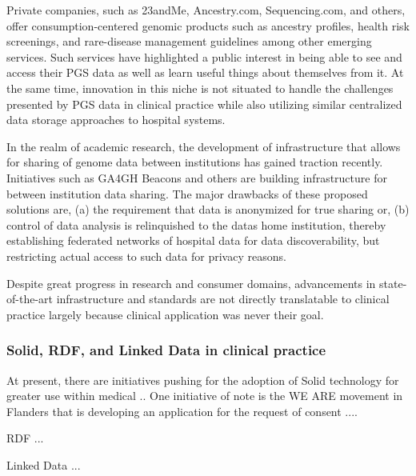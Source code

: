 \documentclass[runningheads]{llncs}
\begin{document}
Private companies, such as 23andMe, Ancestry.com, Sequencing.com, and others, offer consumption-centered genomic products such as ancestry profiles, health risk screenings, and rare-disease management guidelines among other emerging services. 
Such services have highlighted a public interest in being able to see and access their PGS data as well as learn useful things about themselves from it.
At the same time, innovation in this niche is not situated to handle the challenges presented by PGS data in clinical practice while also utilizing similar centralized data storage approaches to hospital systems.

In the realm of academic research, the development of infrastructure that allows for sharing of genome data between institutions has gained traction recently. 
Initiatives such as GA4GH Beacons \cite{rambla_beacon_2022} and others are building infrastructure for between institution data sharing. 
The major drawbacks of these proposed solutions are, (a) the requirement that data is anonymized for true sharing or, (b) control of data analysis is relinquished to the data\textquotesingle s home institution, thereby establishing federated networks of hospital data for data discoverability, but restricting actual access to such data for privacy reasons.

Despite great progress in research and consumer domains, advancements in state-of-the-art infrastructure and standards are not directly translatable to clinical practice largely because clinical application was never their goal. 

\subsubsection{Solid, RDF, and Linked Data in clinical practice}
At present, there are initiatives pushing for the adoption of Solid technology for greater use within medical ..
One initiative of note is the WE ARE movement in Flanders that is developing an application for the request of consent ....

RDF ...

Linked Data ...
\end{document}
